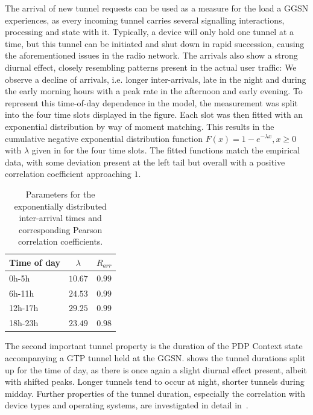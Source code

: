 The arrival of new tunnel requests can be used as a measure for the load a \gls{GGSN} experiences, as every incoming tunnel carries several signalling interactions, processing and state with it.
Typically, a device will only hold one tunnel at a time, but this tunnel can be initiated and shut down in rapid succession, causing the aforementioned issues in the radio network.
The arrivals also show a strong diurnal effect, closely resembling patterns present in the actual user traffic:
We observe a decline of arrivals, i.e. longer inter-arrivals, late in the night and during the early morning hours with a peak rate in the afternoon and early evening.
To represent this time-of-day dependence in the model, the measurement was split into the four time slots displayed in the figure.
Each slot was then fitted with an exponential distribution by way of moment matching.
This results in the cumulative negative exponential distribution function \(F(x) = 1- e^{-\lambda x}, x \geq 0\) with \(\lambda\) given in  for the four time slots.
The fitted functions match the empirical data, with some deviation present at the left tail but overall with a positive correlation coefficient approaching \(1\).

\begin{table}
  \centering
  \caption{Parameters for the exponentially distributed inter-arrival times and corresponding Pearson correlation coefficients.}
  \label{tab:cloud:virtualized_network_functions:measurement_data:evaluation:iat_fits}  
  \begin{tabular}{lcc}
  \toprule
  Time of day & \(\lambda\) & \(R_{arr}\)\\
  \midrule
  0h-5h & $10.67$ & $0.99$\\
  6h-11h & $24.53$ & $0.99$\\
  12h-17h & $29.25$ & $0.99$\\
  18h-23h & $23.49$ & $0.98$\\
   \bottomrule
  \end{tabular}
\end{table}

The second important tunnel property is the duration of the \gls{PDP} Context state accompanying a \gls{GTP} tunnel held at the \gls{GGSN}.
 shows the tunnel durations split up for the time of day, as there is once again a slight diurnal effect present, albeit with shifted peaks.
Longer tunnels tend to occur at night, shorter tunnels during midday.
Further properties of the tunnel duration, especially the correlation with device types and operating systems, are investigated in detail in~\cite{Metzger2014}.

